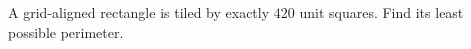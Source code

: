 A grid-aligned rectangle is tiled by exactly $420$ unit squares. Find its least possible perimeter.
